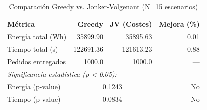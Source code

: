 \begin{table}[htbp]
\centering
\caption{Comparación Greedy vs. Jonker-Volgenant (N=15 escenarios)}
\label{tab:comparison}
\begin{tabular}{lrrr}
\hline
\textbf{Métrica} & \textbf{Greedy} & \textbf{JV (Costes)} & \textbf{Mejora (\%)} \\
\hline
Energía total (Wh) & 35899.90 & 35895.63 & 0.01 \\
Tiempo total (s) & 122691.36 & 121613.23 & 0.88 \\
Pedidos entregados & 1000.0 & 1000.0 & — \\
\hline
\multicolumn{4}{l}{\textit{Significancia estadística (p < 0.05):}} \\
Energía (p-value) & \multicolumn{2}{c}{0.1243} & No \\
Tiempo (p-value) & \multicolumn{2}{c}{0.0834} & No \\
\hline
\end{tabular}
\end{table}